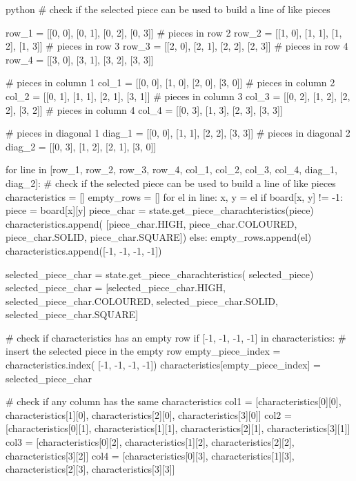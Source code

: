 \begin{mintedbox}{python}
        # check if the selected piece can be used to build a line of like pieces

        row_1 = [[0, 0], [0, 1], [0, 2], [0, 3]]
        # pieces in row 2
        row_2 = [[1, 0], [1, 1], [1, 2], [1, 3]]
        # pieces in row 3
        row_3 = [[2, 0], [2, 1], [2, 2], [2, 3]]
        # pieces in row 4
        row_4 = [[3, 0], [3, 1], [3, 2], [3, 3]]

        # pieces in column 1
        col_1 = [[0, 0], [1, 0], [2, 0], [3, 0]]
        # pieces in column 2
        col_2 = [[0, 1], [1, 1], [2, 1], [3, 1]]
        # pieces in column 3
        col_3 = [[0, 2], [1, 2], [2, 2], [3, 2]]
        # pieces in column 4
        col_4 = [[0, 3], [1, 3], [2, 3], [3, 3]]

        # pieces in diagonal 1
        diag_1 = [[0, 0], [1, 1], [2, 2], [3, 3]]
        # pieces in diagonal 2
        diag_2 = [[0, 3], [1, 2], [2, 1], [3, 0]]

        for line in [row_1, row_2, row_3, row_4, col_1, col_2, col_3, col_4, diag_1, diag_2]:
            # check if the selected piece can be used to build a line of like pieces
            characteristics = []
            empty_rows = []
            for el in line:
                x, y = el
                if board[x, y] != -1:
                    piece = board[x][y]
                    piece_char = state.get_piece_charachteristics(piece)
                    characteristics.append(
                        [piece_char.HIGH, piece_char.COLOURED, piece_char.SOLID, piece_char.SQUARE])
                else:
                    empty_rows.append(el)
                    characteristics.append([-1, -1, -1, -1])

            selected_piece_char = state.get_piece_charachteristics(
                selected_piece)
            selected_piece_char = [selected_piece_char.HIGH, selected_piece_char.COLOURED,
                                    selected_piece_char.SOLID, selected_piece_char.SQUARE]

            # check if characteristics has an empty row
            if [-1, -1, -1, -1] in characteristics:
                # insert the selected piece in the empty row
                empty_piece_index = characteristics.index(
                    [-1, -1, -1, -1])
                characteristics[empty_piece_index] = selected_piece_char

                # check if any column has the same characteristics
                col1 = [characteristics[0][0], characteristics[1][0],
                        characteristics[2][0], characteristics[3][0]]
                col2 = [characteristics[0][1], characteristics[1][1],
                        characteristics[2][1], characteristics[3][1]]
                col3 = [characteristics[0][2], characteristics[1][2],
                        characteristics[2][2], characteristics[3][2]]
                col4 = [characteristics[0][3], characteristics[1][3],
                        characteristics[2][3], characteristics[3][3]]


\end{mintedbox}
